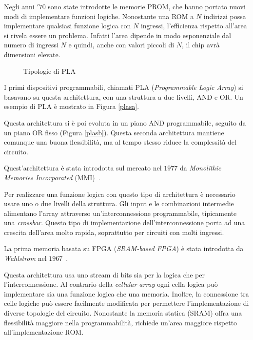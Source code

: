 Negli anni $'70$ sono state introdotte le memorie PROM, che hanno portato nuovi modi di implementare funzioni logiche. Nonostante una ROM a $N$ indirizzi possa implementare qualsiasi funzione logica con $N$ ingressi, l'efficienza rispetto all'area si rivela essere un problema. Infatti l'area dipende in modo esponenziale dal numero di ingressi $N$ e quindi, anche con valori piccoli di $N$, il chip avrà dimensioni elevate.

\begin{figure}
\centering
{}
\hspace{5mm}
\caption{Tipologie di PLA}\label{plas}
\end{figure}

I primi dispositivi programmabili, chiamati PLA (\textit{Programmable Logic Array}) si basavano su questa architettura, con una struttura a due livelli, AND e OR. Un esempio di PLA è mostrato in Figura \ref{plasa}.

Questa architettura si è poi evoluta in un piano AND programmabile, seguito da un piano OR fisso (Figura \ref{plasb}). Questa seconda architettura mantiene comunque una buona flessibilità, ma al tempo stesso riduce la complessità del circuito.

Quest'architettura è stata introdotta sul mercato nel $1977$ da \textit{Monolithic Memories Incorporated} (MMI)~\cite{birkner1978programmable}.

Per realizzare una funzione logica con questo tipo di architettura è necessario usare uno o due livelli della struttura. Gli input e le combinazioni intermedie alimentano l'array attraverso un'interconnessione programmabile, tipicamente una \textit{crossbar}. Questo tipo di implementazione dell'interconnessione porta ad una crescita dell'area molto rapida, soprattutto per circuiti con molti ingressi.

La prima memoria basata su FPGA (\textit{SRAM-based FPGA}) è stata introdotta da \textit{Wahlstrom} nel $1967$~\cite{wahl}. 

Questa architettura usa uno stream di bits sia per la logica che per l'interconnessione. Al contrario della \textit{cellular array} ogni cella logica può implementare sia una funzione logica che una memoria. Inoltre, la connessione tra celle logiche può essere facilmente modificata per permettere l'implementazione di diverse topologie del circuito. Nonostante la memoria statica (SRAM) offra una flessibilità maggiore nella programmabilità, richiede un'area maggiore rispetto all'implementazione ROM.

